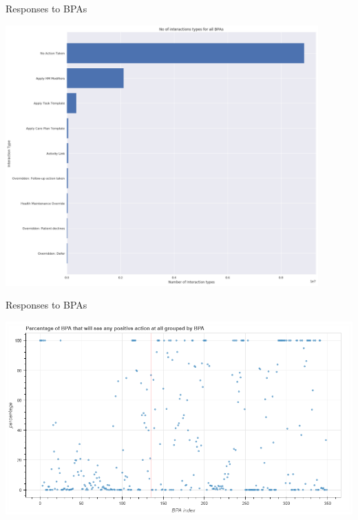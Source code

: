 \documentclass[10pt]{beamer}
\begin{document}
\begin{frame}{Responses to BPAs}
	\begin{center}
		\includegraphics[width=0.9\textwidth, center, trim=0cm 0cm 0cm 0cm]{images/interaction_counts.png}
	\end{center}
\end{frame}

\begin{frame}{Responses to BPAs}
	\begin{center}
		\includegraphics[width=1.1\textwidth, center, trim=0cm 0cm 0cm 0cm]{images/percent_positive_int.png}
	\end{center}
\end{frame}
\end{document}
